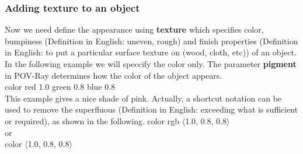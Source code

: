 \documentclass[fleqn,10pt]{wlscirep}
\newcommand*{\PV}{POV-Ray}
\newcommand*{\DF}{Definition in English}
\begin{document}
\subsubsection{Adding texture to an object}
Now we need define the appearance using \textbf{texture} which specifies color, bumpiness (\DF: uneven, rough) and finish properties (\DF: to put a particular surface texture on (wood, cloth, etc)) of an object. In the following example we will speccify the color only. The parameter \textbf{pigment} in \PV{} determines how the color of the object appears.\\
\textcolor[rgb]{0.2,0.1,1}{ color red 1.0 green 0.8 blue 0.8} \\
This example gives a nice shade of pink. Actually, a shortcut notation can be used to remove the superfluous (\DF: exceeding what is sufficient or required), as shown in the following.
\textcolor[rgb]{0.2,0.1,1}{ color rgb $\langle$1.0, 0.8, 0.8$\rangle$} \\
or \\
\textcolor[rgb]{0.2,0.1,1}{ color $\langle$1.0, 0.8, 0.8$\rangle$} \\
\end{document}
